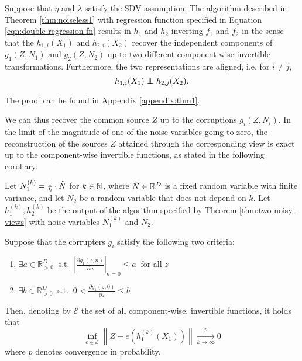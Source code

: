 \medskip

\begin{theorem}\label{thm:two-noisy-views}
	Suppose that ${\eta}$ and ${\lambda}$ satisfy the SDV assumption.
	The algorithm described in Theorem \ref{thm:noiseless1} with regression function specified in Equation \ref{eqn:double-regression-fn} results in ${h}_1$ and ${h}_2$ inverting ${f}_1$ and ${f}_2$ in the sense that the $h_{1,i}({X}_1)$ and $h_{2,i}({X}_2)$ recover the independent components of ${g}_1({Z}, {N}_1)$ and ${g}_2({Z}, {N}_2)$ up to two different component-wise invertible transformations. Furthermore, the two representations are aligned, i.e. for $i\not=j$,
	\begin{equation*}
	h_{1,i}({X}_{1})\independent h_{2,j}({X}_{2}).
	\end{equation*}
\end{theorem}
The proof can be found in Appendix \ref{appendix:thm1}.

We can thus recover the common source $Z$ up to the corruptions ${g}_i(Z, N_i)$.
In the limit of the magnitude of one of the noise variables going to zero, the reconstruction of the sources $Z$ attained through the corresponding view is exact up to the component-wise invertible functions, as stated in the following corollary.

\medskip
\begin{corollary}
	\label{crl:lownoise}
	Let $N_1^{(k)} = \frac{1}{k} \cdot  \Tilde{N}$ for $k \in \mathbb{N}$, where $\Tilde{N}\in\mathbb{R}^D$ is a fixed random variable with finite variance, and let $N_2$ be a random variable that does not depend on $k$.
	Let $h_1^{(k)}, h_2^{(k)}$ be the output of the algorithm specified by Theorem \ref{thm:two-noisy-views} with noise variables $N_1^{(k)}$ and $N_2$.
	
	Suppose that the corrupters $g_i$ satisfy the following two criteria:
	\begin{enumerate}
		\item $\exists {a}  \in \mathbb{R}_{> 0}^D \: $   s.t. $\: \left|\frac{\partial g_1(z,n)}{\partial n} \right|_{n=0} \leq {a} \: $ for all ${z}$
		\item $\exists {b}  \in \mathbb{R}_{> 0}^D \: $ s.t. $\: 0<\frac{\partial g_1(z,0)}{\partial z} \leq b$
	\end{enumerate}
	Then, denoting by $\mathcal{E}$ the set of all component-wise, invertible functions, it holds that
	\[
	 \inf_{{e}\in \mathcal{E}}  \left \|Z - {e}(h_1^{(k)}(X_1)) \right \| \xrightarrow[k \to \infty]{p} 0
	\]
	where $p$ denotes convergence in probability.
\end{corollary}

